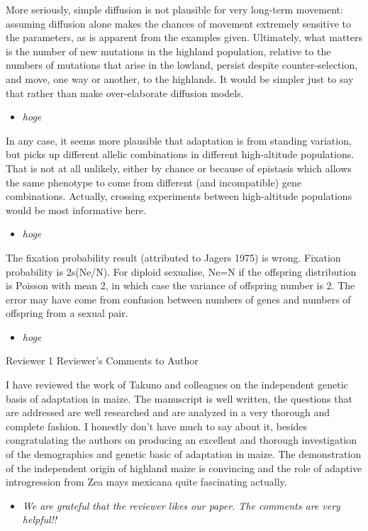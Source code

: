 \documentclass[onecolumn,oneside,letterpaper]{article}
\begin{document}
More seriously, simple diffusion is not plausible for very long-term movement: assuming diffusion alone makes the chances of movement extremely sensitive to the parameters, as is apparent from the examples given.  Ultimately, what matters is the number of new mutations in the highland population, relative to the numbers of mutations that arise in the lowland, persist despite counter-selection, and move, one way or another, to the highlands.  It would be simpler just to say that rather than make over-elaborate diffusion models. 
\setlength{\parskip}{-5.0pt}
\begin{itemize}
\item \textit{ hoge }
\end{itemize}
\setlength{\parskip}{10.0pt}

In any case, it seems more plausible that adaptation is from standing variation, but picks up different allelic combinations in different high-altitude populations.  That is not at all unlikely, either by chance or because of epistasis which allows the same phenotype to come from different (and incompatible) gene combinations.  Actually, crossing experiments between high-altitude populations would be most informative here. 
\setlength{\parskip}{-5.0pt}
\begin{itemize}
\item \textit{ hoge }
\end{itemize}
\setlength{\parskip}{10.0pt}

The fixation probability result (attributed to Jagers 1975) is wrong.  Fixation probability is 2s(Ne/N).  For diploid sexualise, Ne=N if the offspring distribution is Poisson with mean 2, in which case the variance of offspring number is 2.  The error may have come from confusion between numbers of genes and numbers of offspring from a sexual pair.
\setlength{\parskip}{-5.0pt}
\begin{itemize}
\item \textit{ hoge }
\end{itemize}
\setlength{\parskip}{10.0pt}


Reviewer 1 Reviewer's Comments to Author

I have reviewed the work of Takuno and colleagues on the independent genetic basis of adaptation in maize. The manuscript is well written, the questions that are addressed are well researched and are analyzed in a very thorough and complete fashion. I honestly don't have much to say about it, besides congratulating the authors on producing an excellent and thorough investigation of the demographics and genetic basic of adaptation in maize. The demonstration of the independent origin of highland maize is convincing and the role of adaptive introgression from Zea mays mexicana quite fascinating actually.  
\setlength{\parskip}{-5.0pt}
\begin{itemize}
\item \textit{ We are grateful that the reviewer likes our paper.  The comments are very helpful!! }
\end{itemize}
\setlength{\parskip}{10.0pt}
\end{document}
